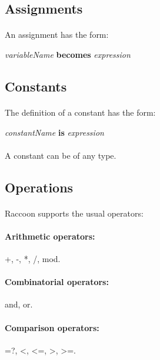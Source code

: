 \documentclass[12pt,a4paper]{article}
\begin{document}
\subsection{Assignments}

\paragraph{}
An assignment has the form: 
\begin{center}
\textit{variableName}  \textbf{becomes} \textit{expression}
\end{center}

\subsection{Constants}

\paragraph{}
The definition of a constant has the form:
\begin{center}
\textit{constantName} \textbf{is} \textit{expression}
\end{center}

\paragraph{}
A constant can be of any type.

\subsection{Operations}
\paragraph{} 
Raccoon supports the usual operators:

\paragraph{Arithmetic operators:}
+, -, *, /, mod.

\paragraph{Combinatorial operators:}
and, or.

\paragraph{Comparison operators:}
=?, <, <=, >, >=.
\end{document}
